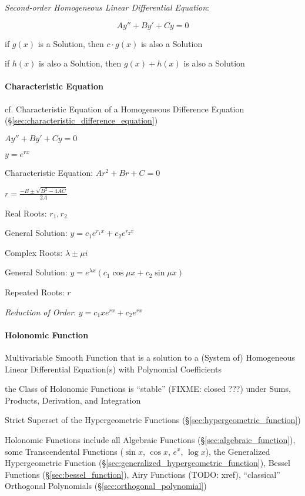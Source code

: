 \emph{Second-order Homogeneous Linear Differential Equation}:

\[
  A y'' + B y' + C y = 0
\]

if $g(x)$ is a Solution, then $c\cdot{g(x)}$ is also a Solution

if $h(x)$ is also a Solution, then $g(x) + h(x)$ is also a Solution



\paragraph{Characteristic Equation}\label{sec:characteristic_equation}\hfill

cf. Characteristic Equation of a Homogeneous Difference Equation
(\S\ref{sec:characteristic_difference_equation})

$A y'' + B y' + C y = 0$

$y = e^{rx}$

Characteristic Equation: $Ar^2 + Br + C = 0$

$r = \frac{-B \pm \sqrt{B^2 - 4AC}}{2A}$

Real Roots: $r_1, r_2$

General Solution: $y = c_1e^{r_1x} + c_2e^{r_2x}$

Complex Roots: $\lambda \pm \mu i$

General Solution: $y = e^{\lambda x}(c_1 \cos\mu{x} + c_2 \sin\mu{x})$

Repeated Roots: $r$

\emph{Reduction of Order}: $y = c_1 x e^{rx} + c_2 e^{rx}$



\paragraph{Holonomic Function}\label{sec:holonomic_function}\hfill

Multivariable Smooth Function that is a solution to a (System of) Homogeneous
Linear Differential Equation(s) with Polynomial Coefficients

the Class of Holonomic Functions is ``stable'' (FIXME: closed ???) under Sums,
Products, Derivation, and Integration

Strict Superset of the Hypergeometric Functions
(\S\ref{sec:hypergeometric_function})

Holonomic Functions include all Algebraic Functions
(\S\ref{sec:algebraic_function}), some Transcendental Functions ($\sin x$,
$\cos x$, $e^x$, $\log x$), the Generalized Hypergeometric Function
(\S\ref{sec:generalized_hypergeometric_function}), Bessel Functions
(\S\ref{sec:bessel_function}), Airy Functions (TODO: xref), ``classical''
Orthogonal Polynomials (\S\ref{sec:orthogonal_polynomial})


